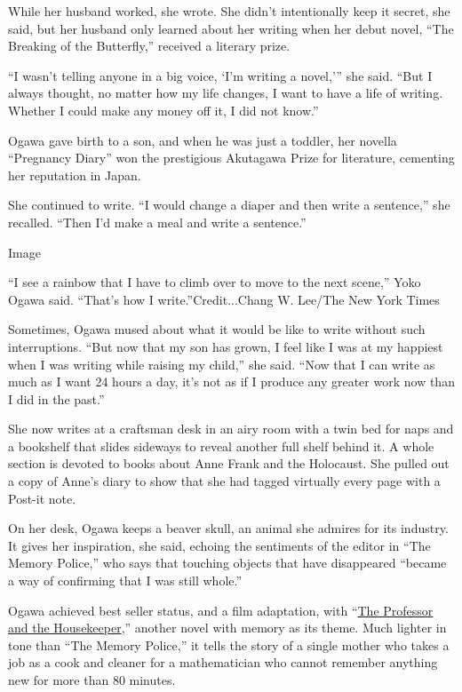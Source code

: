 While her husband worked, she wrote. She didn't intentionally keep it
secret, she said, but her husband only learned about her writing when
her debut novel, ``The Breaking of the Butterfly,'' received a literary
prize.

``I wasn't telling anyone in a big voice, `I'm writing a novel,''' she
said. ``But I always thought, no matter how my life changes, I want to
have a life of writing. Whether I could make any money off it, I did not
know.''

Ogawa gave birth to a son, and when he was just a toddler, her novella
``Pregnancy Diary'' won the prestigious Akutagawa Prize for literature,
cementing her reputation in Japan.

She continued to write. ``I would change a diaper and then write a
sentence,'' she recalled. ``Then I'd make a meal and write a sentence.''

Image

``I see a rainbow that I have to climb over to move to the next scene,''
Yoko Ogawa said. ``That's how I write.''Credit...Chang W. Lee/The New
York Times

Sometimes, Ogawa mused about what it would be like to write without such
interruptions. ``But now that my son has grown, I feel like I was at my
happiest when I was writing while raising my child,'' she said. ``Now
that I can write as much as I want 24 hours a day, it's not as if I
produce any greater work now than I did in the past.''

She now writes at a craftsman desk in an airy room with a twin bed for
naps and a bookshelf that slides sideways to reveal another full shelf
behind it. A whole section is devoted to books about Anne Frank and the
Holocaust. She pulled out a copy of Anne's diary to show that she had
tagged virtually every page with a Post-it note.

On her desk, Ogawa keeps a beaver skull, an animal she admires for its
industry. It gives her inspiration, she said, echoing the sentiments of
the editor in ``The Memory Police,'' who says that touching objects that
have disappeared ``became a way of confirming that I was still whole.''

Ogawa achieved best seller status, and a film adaptation, with
``\href{https://www.nytimes3xbfgragh.onion/2009/03/01/books/review/Overbye-t.html}{The
Professor and the Housekeeper},'' another novel with memory as its
theme. Much lighter in tone than ``The Memory Police,'' it tells the
story of a single mother who takes a job as a cook and cleaner for a
mathematician who cannot remember anything new for more than 80 minutes.

